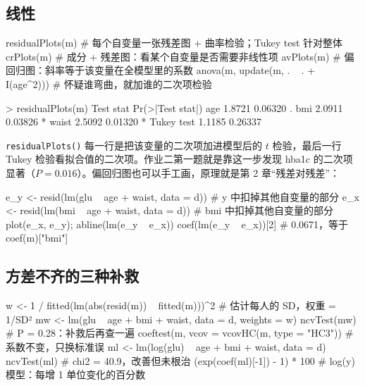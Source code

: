\subsection{线性}
\begin{RCode}[R · 线性的几种查法]
residualPlots(m)        # 每个自变量一张残差图 + 曲率检验；Tukey test 针对整体
crPlots(m)              # 成分 + 残差图：看某个自变量是否需要非线性项
avPlots(m)              # 偏回归图：斜率等于该变量在全模型里的系数
anova(m, update(m, . ~ . + I(age^2)))     # 怀疑谁弯曲，就加谁的二次项检验
\end{RCode}
\begin{ROut}
> residualPlots(m)
           Test stat Pr(>|Test stat|)
age           1.8721          0.06320 .
bmi           2.0911          0.03826 *
waist         2.5092          0.01320 *
Tukey test    1.1185          0.26337
\end{ROut}
\Verb|residualPlots()| 每一行是把该变量的二次项加进模型后的 $t$ 检验，最后一行 Tukey 检验看拟合值的二次项。作业二第一题就是靠这一步发现 hba1c 的二次项显著（$P=0.016$）。偏回归图也可以手工画，原理就是第 2 章“残差对残差”：

\begin{RCode}
e_y <- resid(lm(glu ~ age + waist, data = d))   # y 中扣掉其他自变量的部分
e_x <- resid(lm(bmi ~ age + waist, data = d))   # bmi 中扣掉其他自变量的部分
plot(e_x, e_y); abline(lm(e_y ~ e_x))
coef(lm(e_y ~ e_x))[2]                          # 0.0671，等于 coef(m)["bmi"]
\end{RCode}

\subsection{方差不齐的三种补救}
\begin{RCode}
w  <- 1 / fitted(lm(abs(resid(m)) ~ fitted(m)))^2     # 估计每人的 SD，权重 = 1/SD²
mw <- lm(glu ~ age + bmi + waist, data = d, weights = w)
ncvTest(mw)                                             # P = 0.28：补救后再查一遍
coeftest(m, vcov = vcovHC(m, type = "HC3"))             # 系数不变，只换标准误
ml <- lm(log(glu) ~ age + bmi + waist, data = d)
ncvTest(ml)                                             # chi2 = 40.9，改善但未根治
(exp(coef(ml)[-1]) - 1) * 100                           # log(y) 模型：每增 1 单位变化的百分数
\end{RCode}


